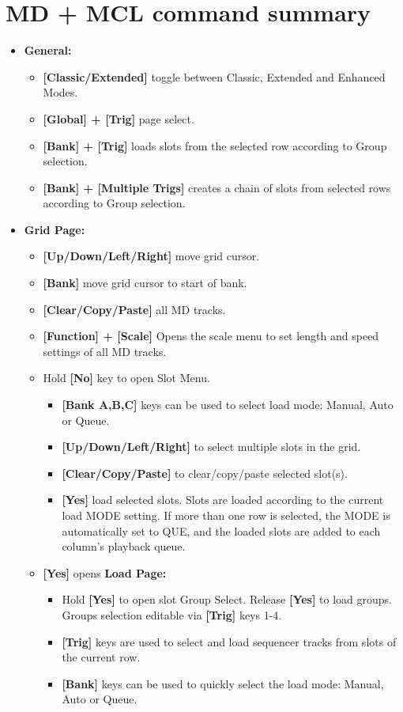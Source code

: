 \section{MD + MCL command summary}
\begin{itemize}
\item \textbf{General:}
   \begin{itemize}
      \item \textbf{[Classic/Extended] } toggle between Classic, Extended and Enhanced Modes.
      \item \textbf{[Global] + [Trig] } page select.
      \item \textbf{[Bank] + [Trig]} loads slots from the selected row according to Group selection.
      \item \textbf{[Bank] + [Multiple Trigs]} creates a chain of slots from selected rows according to Group selection.
   \end{itemize}

\item \textbf{Grid Page:}
    \begin{itemize}
      \item \textbf{[Up/Down/Left/Right]} move grid cursor.
      \item \textbf{[Bank]} move grid cursor to start of bank.
      \item \textbf{[Clear/Copy/Paste]} all MD tracks.
      \item \textbf{[Function] + [Scale]} Opens the scale menu to set length and speed settings of all MD tracks.
      \item Hold \textbf{[No]} key to open Slot Menu.
      \begin{itemize}
                \item \textbf{[Bank A,B,C]} keys can be used to select load mode: Manual, Auto or Queue.
                \item \textbf{[Up/Down/Left/Right]} to select multiple slots in the grid.
                \item \textbf{[Clear/Copy/Paste]} to clear/copy/paste selected slot(s).
                \item \textbf{[Yes]} load selected slots. Slots are loaded according to the current load MODE setting. If more than one row is selected, the MODE is automatically set to QUE, and the loaded slots are added to each column's playback queue.                
      \end{itemize}

\item \textbf{[Yes]} opens \textbf{Load Page:}
    \begin{itemize}
    \item Hold \textbf{[Yes]} to open slot Group Select. Release \textbf{[Yes]} to load groups. Groups selection editable via \textbf{[Trig]} keys 1-4.
    \item \textbf{[Trig]} keys are used to select and load sequencer tracks from slots of the current row.
    \item \textbf{[Bank]} keys can be used to quickly select the load mode: Manual, Auto or Queue.
    \end{itemize}
    

\end{itemize}
\end{itemize}

